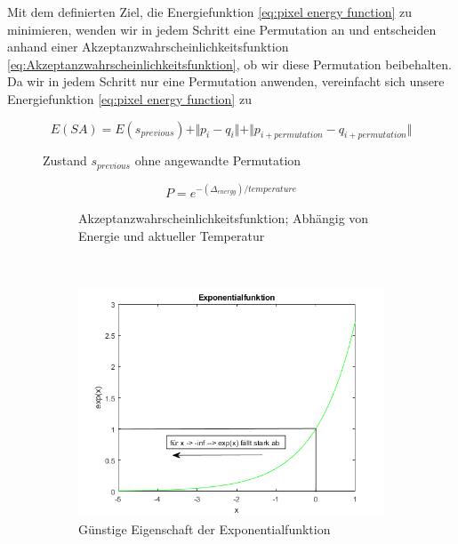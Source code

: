 Mit dem definierten Ziel, die Energiefunktion \ref{eq:pixel energy function} zu minimieren, wenden 
wir in jedem Schritt eine Permutation an und entscheiden anhand einer Akzeptanzwahrscheinlichkeitsfunktion
\ref{eq:Akzeptanzwahrscheinlichkeitsfunktion}, ob wir diese Permutation beibehalten.
Da wir in jedem Schritt nur eine Permutation anwenden, vereinfacht sich unsere Energiefunktion
\ref{eq:pixel energy function} zu 

\newpage

\begin{figure}[H]
    \begin{tcolorbox}[rightrule=3mm, rounded corners=east]
    \[ E(SA) = E(s_{previous}) + \Vert{p_{i}-q_{i}}\Vert + \Vert{p_{i 
        + permutation}-q_{i + permutation}}\Vert\]
    \end{tcolorbox}
  \caption{Zustand $s_{previous}$ ohne angewandte Permutation}
  \label{eq:vereinfachte pixel energy function}
\end{figure}


\begin{figure}[H]
    \centering
    \begin{subfigure}[b]{0.4\textwidth}
        \begin{tcolorbox}[rightrule=3mm, rounded corners=east]
            \begin{equation}\label{eq:Akzeptanzwahrscheinlichkeitsfunktion}
                P = e^{-(\Delta_{energy})/ temperature}
            \end{equation}
        \end{tcolorbox}
        \caption{Akzeptanzwahrscheinlichkeitsfunktion; Abhängig von Energie und aktueller Temperatur}
    \end{subfigure}
    ~ %
    \begin{subfigure}[b]{0.7\textwidth}
        \centering \includegraphics[interpolate=false,width=\linewidth]{content/simulatedAnnealing/Bilder/exponentialfunktion_as_PDF.png}
        \caption{Günstige Eigenschaft der Exponentialfunktion}
        \label{fig:Exponentialfunktion}
    \end{subfigure}
    \caption{}
\end{figure}

